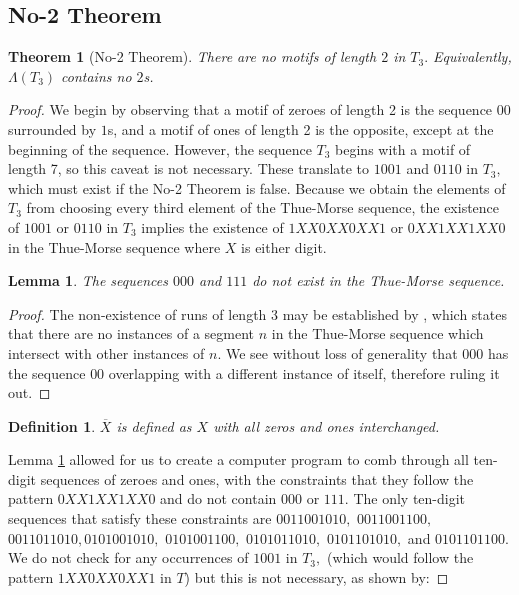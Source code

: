 \documentclass{article}
\newtheorem{theorem}{Theorem}[section]
\newtheorem{lemma}{Lemma}[section]
\newtheorem{definition}{Definition}[section]
\begin{document}
\subsection{No-2 Theorem}

\begin{theorem}[No-2 Theorem]
\label{no2}
There are no motifs of length $2$ in $T_3.$ Equivalently, $\Lambda(T_3)$ contains no $2$s.
\end{theorem}

\begin{proof}
We begin by observing that a motif of zeroes of length 2 is the sequence $00$ surrounded by $1$s, and a motif of ones of length 2 is the opposite, except at the beginning of the sequence. However, the sequence $T_3$ begins with a motif of length 7, so this caveat is not necessary. These translate to $1001$ and $0110$ in $T_3,$ which must exist if the No-2 Theorem is false. Because we obtain the elements of $T_3$ from choosing every third element of the Thue-Morse sequence, the existence of $1001$ or $0110$ in $T_3$ implies the existence of $1XX0XX0XX1$ or $0XX1XX1XX0$ in the Thue-Morse sequence where $X$ is either digit.

\begin{lemma}
\label{triplet}
The sequences $000$ and $111$ do not exist in the Thue-Morse sequence.
\end{lemma}

\begin{proof} The non-existence of runs of length 3 may be established by \cite[Corollary 1]{ubiq15}, which states that there are no instances of a segment $n$ in the Thue-Morse sequence which intersect with other instances of $n.$ We see without loss of generality that $000$ has the sequence $00$ overlapping with a different instance of itself, therefore ruling it out.
\end{proof}

\begin{definition}
\label{overline}
$\overline{X}$ is defined as $X$ with all zeros and ones interchanged.
\end{definition}

Lemma \ref{triplet} allowed for us to create a computer program to comb through all ten-digit sequences of zeroes and ones, with the constraints that they follow the pattern $0XX1XX1XX0$ and do not contain $000$ or $111.$  The only ten-digit sequences that satisfy these constraints are $0011001010,$ $0011001100,$ $0011011010,$$0101001010,$ $0101001100,$ $0101011010,$ $0101101010,$ and $0101101100.$ We do not check for any occurrences of $1001$ in $T_3,$ (which would follow the pattern $1XX0XX0XX1$ in $T$) but this is not necessary, as shown by:


\end{proof}
\end{document}
